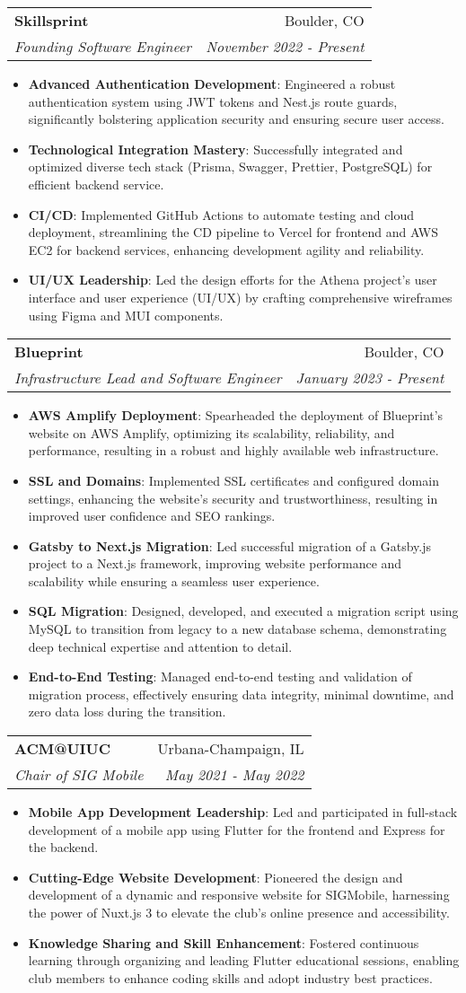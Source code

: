 \documentclass[letterpaper,11pt]{article}
\makeatletter
\newcommand{\resumeItem}[2]{
  \item\small{
    \textbf{#1}{: #2 \vspace{-2pt}}
  }
}
\newcommand{\resumeSubheading}[4]{
  \vspace{-1pt}\item
    \begin{tabular*}{0.97\textwidth}[t]{l@{\extracolsep{\fill}}r}
      \textbf{#1} & #2\vspace{-2pt} \\
      \textit{\small#3} & \textit{\small #4} \\
    \end{tabular*}\vspace{-8pt}
}
\newcommand{\resumeItemListStart}{\begin{itemize}}
\newcommand{\resumeItemListEnd}{\end{itemize}\vspace{-8pt}}
\makeatother
\begin{document}
\resumeSubheading
{Skillsprint}{Boulder, CO}
{Founding Software Engineer}{November 2022 - Present}
\resumeItemListStart
\resumeItem{Advanced Authentication Development}
{Engineered a robust authentication system using JWT tokens and Nest.js route guards, significantly bolstering application security and ensuring secure user access.}
\resumeItem{Technological Integration Mastery}
{Successfully integrated and optimized diverse tech stack (Prisma, Swagger, Prettier, PostgreSQL) for efficient backend service.}
\resumeItem{CI/CD}
{Implemented GitHub Actions to automate testing and cloud deployment, streamlining the CD pipeline to Vercel for frontend and AWS EC2 for backend services, enhancing development agility and reliability.}
\resumeItem{UI/UX Leadership}
{Led the design efforts for the Athena project's user interface and user experience (UI/UX) by crafting comprehensive wireframes using Figma and MUI components.}
\resumeItemListEnd

\resumeSubheading
{Blueprint}{Boulder, CO}
{Infrastructure Lead and Software Engineer}{January 2023 - Present}
\resumeItemListStart
\resumeItem{AWS Amplify Deployment}
{Spearheaded the deployment of Blueprint's website on AWS Amplify, optimizing its scalability, reliability, and performance, resulting in a robust and highly available web infrastructure.}
\resumeItem{SSL and Domains}
{Implemented SSL certificates and configured domain settings, enhancing the website's security and trustworthiness, resulting in improved user confidence and SEO rankings.}
\resumeItem{Gatsby to Next.js Migration}
{Led successful migration of a Gatsby.js project to a Next.js framework, improving website performance and scalability while ensuring a seamless user experience.}
\resumeItem{SQL Migration}
{Designed, developed, and executed a migration script using MySQL to transition from legacy to a new database schema, demonstrating deep technical expertise and attention to detail.}
\resumeItem{End-to-End Testing}
{Managed end-to-end testing and validation of migration process, effectively ensuring data integrity, minimal downtime, and zero data loss during the transition.}
\resumeItemListEnd

\resumeSubheading
{ACM@UIUC}{Urbana-Champaign, IL}
{Chair of SIG Mobile}{May 2021 - May 2022}
\resumeItemListStart
\resumeItem{Mobile App Development Leadership}
{Led and participated in full-stack development of a mobile app using Flutter for the frontend and Express for the backend.}
\resumeItem{Cutting-Edge Website Development}
{Pioneered the design and development of a dynamic and responsive website for SIGMobile, harnessing the power of Nuxt.js 3 to elevate the club's online presence and accessibility.}
\resumeItem{Knowledge Sharing and Skill Enhancement}
{Fostered continuous learning through organizing and leading Flutter educational sessions, enabling club members to enhance coding skills and adopt industry best practices.}
\resumeItemListEnd
\end{document}
